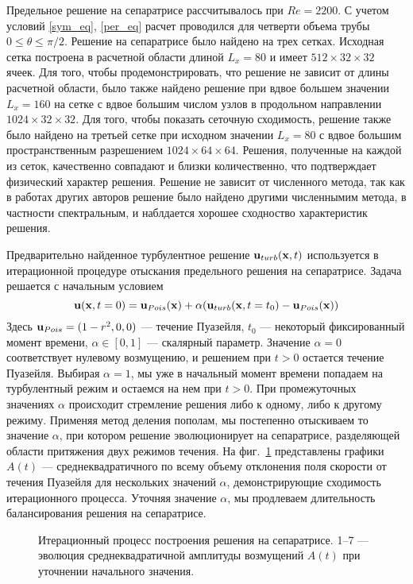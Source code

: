 Предельное решение на сепаратрисе рассчитывалось при $Re=2200$. С учетом условий \eqref{sym_eq}, \eqref{per_eq} расчет проводился для четверти объема трубы $0\leqslant\theta\leqslant\pi/2$. Решение на сепаратрисе было найдено на трех сетках. Исходная сетка построена в расчетной области длиной $L_x = 80$ и имеет $512 \times 32 \times  32$ ячеек. Для того, чтобы продемонстрировать, что решение не зависит от длины расчетной области, было также найдено решение при вдвое большем значении $L_x = 160$ на сетке с вдвое большим числом узлов в продольном направлении $1024 \times 32 \times 32$. Для того, чтобы показать сеточную сходимость, решение также было найдено на третьей сетке при исходном значении $L_x=80$ с вдвое большим пространственным разрешением $1024 \times 64 \times 64$. Решения, полученные на каждой из сеток, качественно совпадают и близки количественно, что подтверждает физический характер решения. Решение не зависит от численного метода, так как в работах других авторов решение было найдено другими численнымим метода, в частности спектральным, и наблдается хорошее сходноство характеристик решения. 

Предварительно найденное турбулентное решение $\mathbf{u}_{turb}(\mathbf{x},t)$ используется в итерационной процедуре отыскания предельного решения на сепаратрисе. Задача решается с начальным условием
\begin{equation*}\label{init}
  \mathbf{u}(\mathbf{x},t=0) = \mathbf{u}_{Pois}(\mathbf{x})+\alpha(\mathbf{u}_{turb}(\mathbf{x},t=t_0) - \mathbf{u}_{Pois}(\mathbf{x}))
\end{equation*}
Здесь $\mathbf{u}_{Pois}=(1-r^2,0,0)$ --- течение Пуазейля, $t_0$ --- некоторый фиксированный момент времени, $\alpha\in[0,1]$ --- скалярный параметр. Значение $\alpha=0$ соответствует нулевому возмущению, и решением при $t>0$ остается течение Пуазейля. Выбирая $\alpha=1$, мы уже в начальный момент времени попадаем на турбулентный режим и остаемся на нем при $t>0$. При промежуточных значениях $\alpha$ происходит стремление решения либо к одному, либо к другому режиму. Применяя метод деления пополам, мы постепенно отыскиваем то значение $\alpha$, при котором решение эволюционирует на сепаратрисе, разделяющей области притяжения двух режимов течения. На фиг.~\ref{bisection_pic} представлены графики $A(t)$ --- среднеквадратичного по всему объему отклонения поля скорости от течения Пуазейля для нескольких значений $\alpha$, демонстрирующие сходимость итерационного процесса. Уточняя значение $\alpha$, мы продлеваем длительность балансирования решения на сепаратрисе.

\begin{figure}[h]
\caption{Итерационный процесс построения решения на сепаратрисе. 1--7 --- эволюция среднеквадратичной амплитуды возмущений $A(t)$ при уточнении начального
значения.}
\label{bisection_pic}
\end{figure}

